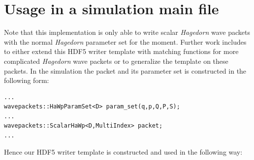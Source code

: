 \section{Usage in a simulation main file}
Note that this implementation is only able to write scalar \textit{Hagedorn} wave packets with the normal \textit{Hagedorn} parameter set for the moment. Further work includes to either extend this HDF5 writer template with matching functions for more complicated \textit{Hagedorn} wave packets or to generalize the template on these packets. In the simulation the packet and its parameter set is constructed in the following form:
\begin{lstlisting}
...
wavepackets::HaWpParamSet<D> param_set(q,p,Q,P,S);
...
wavepackets::ScalarHaWp<D,MultiIndex> packet;
...
\end{lstlisting}
%
%
Hence our HDF5 writer template is constructed and used in the following way:
